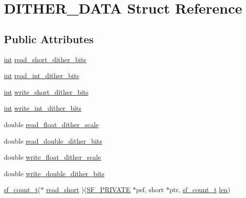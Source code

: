\hypertarget{struct_d_i_t_h_e_r___d_a_t_a}{}\section{D\+I\+T\+H\+E\+R\+\_\+\+D\+A\+TA Struct Reference}
\label{struct_d_i_t_h_e_r___d_a_t_a}
\subsection*{Public Attributes}
\begin{DoxyCompactItemize}
\item 
\hyperlink{xmltok_8h_a5a0d4a5641ce434f1d23533f2b2e6653}{int} \hyperlink{struct_d_i_t_h_e_r___d_a_t_a_a414acde8e946e606c86ab1eafaa9fa11}{read\+\_\+short\+\_\+dither\+\_\+bits}
\item 
\hyperlink{xmltok_8h_a5a0d4a5641ce434f1d23533f2b2e6653}{int} \hyperlink{struct_d_i_t_h_e_r___d_a_t_a_a30eac9624a3aaeebfdb166fead4abb6c}{read\+\_\+int\+\_\+dither\+\_\+bits}
\item 
\hyperlink{xmltok_8h_a5a0d4a5641ce434f1d23533f2b2e6653}{int} \hyperlink{struct_d_i_t_h_e_r___d_a_t_a_a13b47ae92931bfe46ce02f2e9d41afdb}{write\+\_\+short\+\_\+dither\+\_\+bits}
\item 
\hyperlink{xmltok_8h_a5a0d4a5641ce434f1d23533f2b2e6653}{int} \hyperlink{struct_d_i_t_h_e_r___d_a_t_a_ae34656d0373066b9249ce398d1033c58}{write\+\_\+int\+\_\+dither\+\_\+bits}
\item 
double \hyperlink{struct_d_i_t_h_e_r___d_a_t_a_a7f0a332cf7214922c411ebc46d4c1edf}{read\+\_\+float\+\_\+dither\+\_\+scale}
\item 
double \hyperlink{struct_d_i_t_h_e_r___d_a_t_a_afe4d2f2f7773ce39ef2470a9cdd7cbb5}{read\+\_\+double\+\_\+dither\+\_\+bits}
\item 
double \hyperlink{struct_d_i_t_h_e_r___d_a_t_a_a86aec83a13b1a67860a9ccaec0ecb982}{write\+\_\+float\+\_\+dither\+\_\+scale}
\item 
double \hyperlink{struct_d_i_t_h_e_r___d_a_t_a_a13d706b61693f24543f37868f928b027}{write\+\_\+double\+\_\+dither\+\_\+bits}
\item 
\hyperlink{mac_2config_2i386_2lib-src_2libsndfile_2src_2sndfile_8h_a398121a5f562230ea7f772528fff5f84}{sf\+\_\+count\+\_\+t}($\ast$ \hyperlink{struct_d_i_t_h_e_r___d_a_t_a_a5f3dbc8a45b2b9fd16ec17e777f32673}{read\+\_\+short} )(\hyperlink{libsndfile_2src_2common_8h_ab5debd339ecaf40f50a223e218900c24}{S\+F\+\_\+\+P\+R\+I\+V\+A\+TE} $\ast$psf, short $\ast$ptr, \hyperlink{mac_2config_2i386_2lib-src_2libsndfile_2src_2sndfile_8h_a398121a5f562230ea7f772528fff5f84}{sf\+\_\+count\+\_\+t} \hyperlink{lib_2expat_8h_af86d325fecfc8f47b61fbf5a5146f582}{len})

\end{DoxyCompactItemize}
